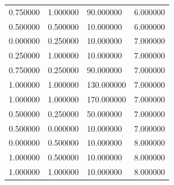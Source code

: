 \documentclass[12pt]{report}
\begin{document}
\begin{center}
\begin{table}[h!]
\begin{center}
\begin{tabular}{|llll|}
				0.750000                      & 1.000000                   & 90.000000                 & 6.000000 \\
				0.500000                      & 0.500000                   & 10.000000                 & 6.000000 \\
				0.000000                      & 0.250000                   & 10.000000                 & 7.000000 \\
				0.250000                      & 1.000000                   & 10.000000                 & 7.000000 \\
				0.750000                      & 0.250000                   & 90.000000                 & 7.000000 \\
				1.000000                      & 1.000000                   & 130.000000                & 7.000000 \\
				1.000000                      & 1.000000                   & 170.000000                & 7.000000 \\
				0.500000                      & 0.250000                   & 50.000000                 & 7.000000 \\
				0.500000                      & 0.000000                   & 10.000000                 & 7.000000 \\
				0.000000                      & 0.500000                   & 10.000000                 & 8.000000 \\
				1.000000                      & 0.500000                   & 10.000000                 & 8.000000 \\
				1.000000                      & 1.000000                   & 10.000000                 & 8.000000 \\ \hline
			\end{tabular}
		\end{center}
	\end{table}
	
	
\end{center}

\newpage
\end{document}
